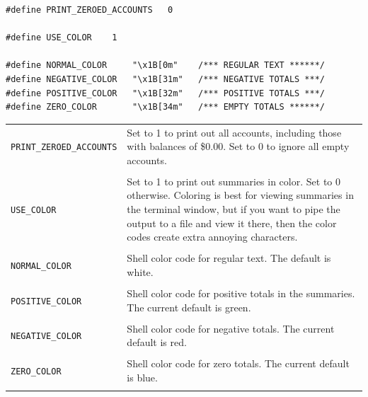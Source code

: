 \documentclass{article}
\begin{document}
\begin{flushleft}
\begin{lstlisting}
#define PRINT_ZEROED_ACCOUNTS   0

#define USE_COLOR    1

#define NORMAL_COLOR     "\x1B[0m"    /*** REGULAR TEXT ******/
#define NEGATIVE_COLOR   "\x1B[31m"   /*** NEGATIVE TOTALS ***/
#define POSITIVE_COLOR   "\x1B[32m"   /*** POSITIVE TOTALS ***/
#define ZERO_COLOR       "\x1B[34m"   /*** EMPTY TOTALS ******/
\end{lstlisting}


\begin{center}
\begin{tabular}{lp{11cm}}
{\tt PRINT\_ZEROED\_ACCOUNTS} & Set to 1 to print out all accounts, including those with balances of \$0.00. Set to 0 to ignore all empty accounts. \\ \\

{\tt USE\_COLOR} & Set to 1 to print out summaries in color. Set to 0 otherwise. Coloring is best for viewing summaries
in the terminal window, but if you want to pipe the output to a file and view it there, then the color codes create extra 
annoying characters. \\ \\

{\tt NORMAL\_COLOR } & Shell color code for regular text. The default is white. \\ \\

{\tt POSITIVE\_COLOR } & Shell color code for positive totals in the summaries. The current default is green. \\ \\

{\tt NEGATIVE\_COLOR } & Shell color code for negative totals. The current default is red. \\ \\

{\tt ZERO\_COLOR } & Shell color code for zero totals. The current default is blue. \\ \\


\end{tabular}
\end{center}







\end{flushleft}
% 
%
\end{document}
